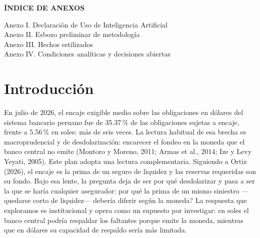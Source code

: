 \documentclass[11pt,a4paper]{article}
\newcommand{\TocAnI}{\pageref{sec:anexo-ia}}
\newcommand{\TocAnII}{\pageref{sec:anexo-met}}
\newcommand{\TocAnIII}{\pageref{sec:anexo-hechos}}
\newcommand{\TocAnIV}{\pageref{sec:anexo-cond}}
\begin{document}
\begin{center}\textbf{ÍNDICE DE ANEXOS}\end{center}
\noindent Anexo I. Declaración de Uso de Inteligencia Artificial \dotfill \TocAnI\\[3pt]
Anexo II. Esbozo preliminar de metodología \dotfill \TocAnII\\[3pt]
Anexo III. Hechos estilizados \dotfill \TocAnIII\\[3pt]
Anexo IV. Condiciones analíticas y decisiones abiertas \dotfill \TocAnIV
\clearpage

\setcounter{page}{1}

\titleformat{\section}{\centering\normalfont\bfseries\uppercase}{}{0pt}{}
\section{Introducción}\label{sec:intro}
\titleformat{\section}{\normalfont\bfseries\uppercase}{}{0pt}{}

En julio de 2026, el encaje exigible medio sobre las obligaciones en dólares del sistema bancario peruano fue de 35.37\,\% de las obligaciones sujetas a encaje, frente a 5.56\,\% en soles: más de seis veces. La lectura habitual de esa brecha es macroprudencial y de desdolarización: encarecer el fondeo en la moneda que el banco central no emite (Montoro y Moreno, 2011; Armas et al., 2014; Ize y Levy Yeyati, 2005). Este plan adopta una lectura complementaria. Siguiendo a Ortiz (2026), el encaje es la prima de un seguro de liquidez y las reservas requeridas son su fondo. Bajo esa lente, la pregunta deja de ser por qué desdolarizar y pasa a ser la que se haría cualquier asegurador: \textquestiondown{}por qué la prima de un mismo siniestro ---quedarse corto de liquidez--- debería diferir según la moneda? La respuesta que exploramos es institucional y opera como un supuesto por investigar: en soles el banco central podría respaldar los faltantes porque emite la moneda, mientras que en dólares su capacidad de respaldo sería más limitada.
\end{document}
